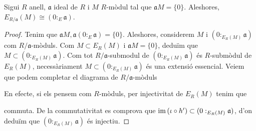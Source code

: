 \begin{lema}\label{env-inj-aniquillador}
    Sigui $R$ anell, $\mathfrak{a}$ ideal de $R$ i $M$ $R$-mòdul tal que $\mathfrak{a}M=\{0\}$. Aleshores, $E_{R/\mathfrak{a}}(M)\cong(0:_{E}\mathfrak{a})$.
    \begin{proof}
        Tenim que $\mathfrak{a}M,\mathfrak{a}(0:_{E}\mathfrak{a})=\{0\}$. Aleshores, considerem $M$ i $(0:_{E_{R}(M)}\mathfrak{a})$ com $R/\mathfrak{a}$-mòduls. Com $M\subset E_{R}(M)$ i $\mathfrak{a}M=\{0\}$, deduïm que $M\subset(0:_{E_{R}(M)}\mathfrak{a})$. Com tot $R/\mathfrak{a}$-submodul de $(0:_{E_{R}(M)}\mathfrak{a})$ és $R$-submòdul de $E_{R}(M)$, necessàriament $M\subset(0:_{E_{R}(M)}\mathfrak{a})$ és una extensió essencial.\newline
        Veiem que podem completar el diagrama de $R/\mathfrak{a}$-mòduls
        \begin{center}
        \end{center}
        En efecte, si els pensem com $R$-mòduls, per injectivitat de $E_{R}(M)$ tenim que
        \begin{center}
        \end{center}
        commuta. De la commutativitat es comprova que $\operatorname{im}{(\iota\circ h')}\subset(0:_{E_{R}(M)}\mathfrak{a})$, d'on deduïm que $(0:_{E_{R}(M)}\mathfrak{a})$ és injectiu.
    \end{proof}
\end{lema}
